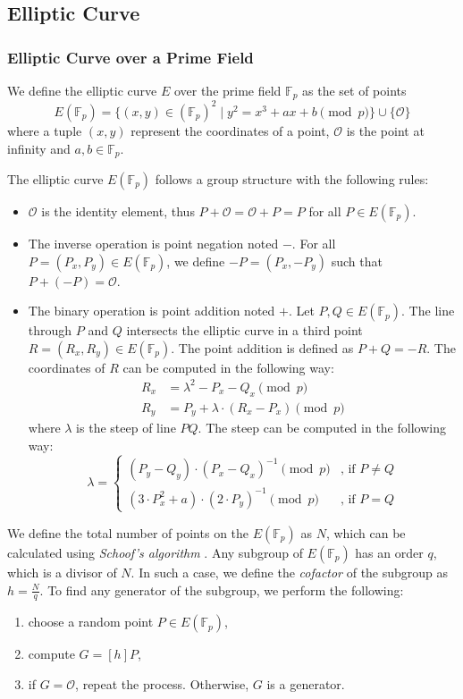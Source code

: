 \subsection{Elliptic Curve}


\subsubsection{Elliptic Curve over a Prime Field} \label{app: elliptic curve over a prime field}
We define the elliptic curve $E$ over the prime field $\mathbb{F}_p$ as the set of points
\[ E(\mathbb{F}_p) = \{ (x, y) \in (\mathbb{F}_p)^2 \mid y^2 = x^3 + ax + b \pmod p \} \cup \{ \mathcal{O} \} \]
where a tuple $(x, y)$ represent the coordinates of a point, $\mathcal{O}$ is the point at infinity and $a, b \in \mathbb{F}_p$.

The elliptic curve $E(\mathbb{F}_p)$ follows a group structure with the following rules:
\begin{itemize}
    \item $\mathcal{O}$ is the identity element, thus $P + \mathcal{O} = \mathcal{O} + P = P$ for all $P \in E(\mathbb{F}_p)$.
    \item The inverse operation is point negation noted $-$. For all $P = (P_x, P_y) \in E(\mathbb{F}_p)$, we define $-P = (P_x, -P_y)$ such that $P + (- P) = \mathcal{O}$.
    \item The binary operation is point addition noted $+$. Let $P, Q \in E(\mathbb{F}_p)$. The line through $P$ and $Q$ intersects the elliptic curve in a third point $R = (R_x, R_y) \in E(\mathbb{F}_p)$. The point addition is defined as $P + Q = -R$. The coordinates of $R$ can be computed in the following way:
    \begin{align*}
        R_x & = \lambda^2 - P_x - Q_x \pmod p \\
        R_y & = P_y + \lambda \cdot (R_x - P_x) \pmod p 
    \end{align*}
    where $\lambda$ is the steep of line $PQ$. The steep can be computed in the following way:
    \[ \lambda = 
    \begin{cases}
        (P_y - Q_y) \cdot (P_x - Q_x)^{-1} \pmod p  & \text{, if } P \neq Q \\
        (3 \cdot P_x^2 + a) \cdot (2 \cdot P_y)^{-1} \pmod{p} & \text{, if } P = Q
    \end{cases}
    \]
\end{itemize}

We define the total number of points on the $E(\mathbb{F}_p)$ as $N$, which can be calculated using \textit{Schoof's algorithm} \cite{Schoof85}. Any subgroup of $E(\mathbb{F}_p)$ has an order $q$, which is a divisor of $N$. In such a case, we define the \textit{cofactor} of the subgroup as $h = \frac{N}{q}$. To find any generator of the subgroup, we perform the following:
\begin{enumerate}
    \item choose a random point $P \in E(\mathbb{F}_p)$,
    \item compute $G = [h]P$,
    \item if $G = \mathcal{O}$, repeat the process. Otherwise, $G$ is a generator.
\end{enumerate}

